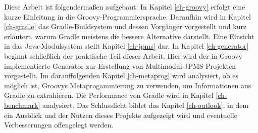 Diese Arbeit ist folgendermaßen aufgebaut:
In Kapitel \ref{ch-groovy} erfolgt eine kurze Einleitung in die Groovy-Programmiersprache.
Daraufhin wird in Kapitel \ref{ch-gradle} das Gradle-Buildsystem und dessen Vorgänger vorgestellt und kurz erläutert, warum Gradle meistens die bessere Alternative darstellt.
Eine Einsicht in das Java-Modulsystem stellt Kapitel \ref{ch-jpms} dar.
In Kapitel \ref{ch-generator} beginnt schließlich der praktische Teil dieser Arbeit. Hier wird der in Groovy implementierte Generator zur Erstellung von Multimodul-JPMS Projekten vorgestellt.
Im darauffolgenden Kapitel \ref{ch-metaprog} wird analysiert, ob es möglich ist, Groovys Metaprogammierung zu verwenden, um Informationen aus Gradle zu extrahieren.
Die Performance von Gradle wird in Kapitel \ref{ch-benchmark} analysiert.
Das Schlusslicht bildet das Kapitel \ref{ch-outlook}, in dem ein Ausblick und der Nutzen dieses Projekts aufgezeigt wird und eventuelle Verbesserungen offengelegt werden.

